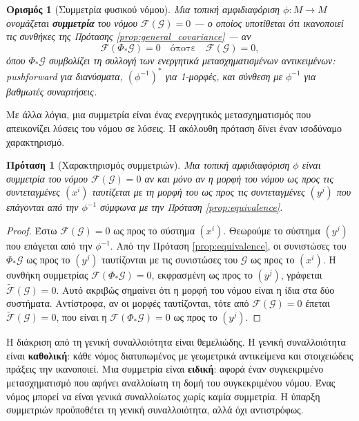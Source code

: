 \documentclass[11pt,a4paper,twoside,openright]{book}
\newtheorem{proposition}[lemma]{Πρόταση}
\newtheorem{definition}[lemma]{Ορισμός}
\begin{document}
\begin{definition}[Συμμετρία φυσικού νόμου]
Μια τοπική αμφιδιαφόριση $\phi: M \to M$ ονομάζεται \textbf{συμμετρία} του νόμου $\mathcal{F}(\mathcal{G}) = 0$ — ο οποίος υποτίθεται ότι ικανοποιεί τις συνθήκες της Πρότασης \ref{prop:general_covariance} — αν
\[
\mathcal{F}(\Phi_* \mathcal{G}) = 0 \quad \text{όποτε} \quad \mathcal{F}(\mathcal{G}) = 0,
\]
όπου $\Phi_* \mathcal{G}$ συμβολίζει τη συλλογή των ενεργητικά μετασχηματισμένων αντικειμένων: pushforward για διανύσματα, $(\phi^{-1})^*$ για 1-μορφές, και σύνθεση με $\phi^{-1}$ για βαθμωτές συναρτήσεις.
\end{definition}
Με άλλα λόγια, μια συμμετρία είναι ένας ενεργητικός μετασχηματισμός που απεικονίζει λύσεις του νόμου σε λύσεις. Η ακόλουθη πρόταση δίνει έναν ισοδύναμο χαρακτηρισμό.

\begin{proposition}[Χαρακτηρισμός συμμετριών]
\label{prop:symmetry_characterization}
Μια τοπική αμφιδιαφόριση $\phi$ είναι συμμετρία του νόμου $\mathcal{F}(\mathcal{G}) = 0$ αν και μόνο αν η μορφή του νόμου ως προς τις συντεταγμένες $(x^i)$ ταυτίζεται με τη μορφή του ως προς τις συντεταγμένες $(y^j)$ που επάγονται από την $\phi^{-1}$ σύμφωνα με την Πρόταση \ref{prop:equivalence}.
\end{proposition}

\begin{proof}
Έστω $\mathcal{F}(\mathcal{G}) = 0$ ως προς το σύστημα $(x^i)$. Θεωρούμε το σύστημα $(y^j)$ που επάγεται από την $\phi^{-1}$. Από την Πρόταση \ref{prop:equivalence}, οι συνιστώσες του $\Phi_* \mathcal{G}$ ως προς το $(y^j)$ ταυτίζονται με τις συνιστώσες του $\mathcal{G}$ ως προς το $(x^i)$. Η συνθήκη συμμετρίας $\mathcal{F}(\Phi_* \mathcal{G}) = 0$, εκφρασμένη ως προς το $(y^j)$, γράφεται $\tilde{\mathcal{F}}(\mathcal{G}) = 0$. Αυτό ακριβώς σημαίνει ότι η μορφή του νόμου είναι η ίδια στα δύο συστήματα. Αντίστροφα, αν οι μορφές ταυτίζονται, τότε από $\mathcal{F}(\mathcal{G}) = 0$ έπεται $\tilde{\mathcal{F}}(\mathcal{G}) = 0$, που είναι η $\mathcal{F}(\Phi_* \mathcal{G}) = 0$ ως προς το $(y^j)$.
\end{proof}

Η διάκριση από τη γενική συναλλοιότητα είναι θεμελιώδης. Η γενική συναλλοιότητα είναι \textbf{καθολική}: κάθε νόμος διατυπωμένος με γεωμετρικά αντικείμενα και στοιχειώδεις πράξεις την ικανοποιεί. Μια συμμετρία είναι \textbf{ειδική}: αφορά έναν συγκεκριμένο μετασχηματισμό που αφήνει αναλλοίωτη τη δομή του συγκεκριμένου νόμου. Ένας νόμος μπορεί να είναι γενικά συναλλοίωτος χωρίς καμία συμμετρία. Η ύπαρξη συμμετριών προϋποθέτει τη γενική συναλλοιότητα, αλλά όχι αντιστρόφως.
\end{document}
